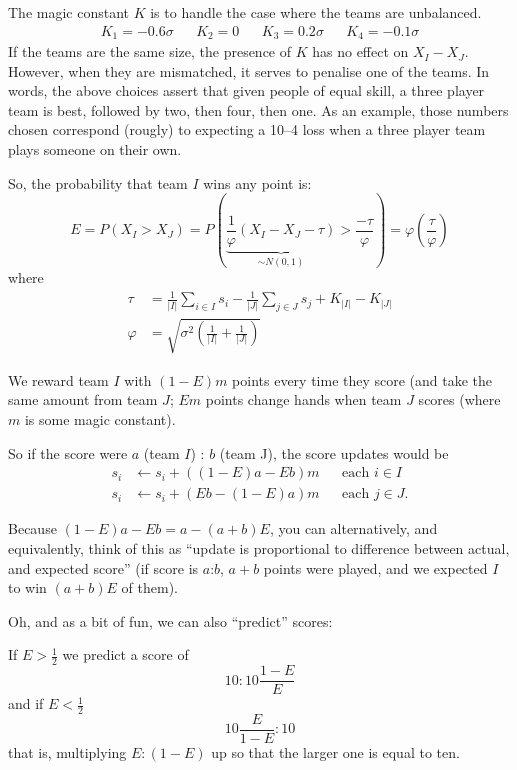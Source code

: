 \documentclass{article}
\begin{document}
The magic constant $K$ is to handle the case where the teams are unbalanced.
\begin{align*}
    K_1 = -0.6\sigma &&
    K_2 =  0 &&
    K_3 =  0.2\sigma &&
    K_4 = -0.1\sigma
\end{align*}
If the teams are the same size, the presence of $K$ has no effect on $X_I - X_J$. However, when they are mismatched, it serves to penalise one of the teams.
In words, the above choices assert that given people of equal skill, a three player team is best, followed by two, then four, then one. As an example, those numbers chosen correspond (rougly) to expecting a 10--4 loss when a three player team plays someone on their own.

So, the probability that team $I$ wins any point is:
\[
    E = P( X_I > X_J ) = P\left( \underbrace{ \frac{1}{\varphi} ( X_I - X_J - \tau ) }_{\sim N(0, 1)}
                                 > \frac{-\tau}{\varphi} \right)
                       = \varphi\left( \frac{\tau}{\varphi} \right)
\]
where
\begin{align*}
    \tau &= \frac{1}{|I|} \sum_{i \in I} s_i - \frac{1}{|J|} \sum_{j \in J} s_j + K_{|I|} - K_{|J|} \\
    \varphi &= \sqrt{ \sigma^2 \left( \frac{1}{|I|} + \frac{1}{|J|} \right) }
\end{align*}

We reward team $I$ with $(1 - E)m$ points every time they score (and take the same amount from team $J$; $Em$ points change hands when team $J$ scores (where $m$ is some magic constant).

So if the score were $a$ (team $I$) : $b$ (team J), the score updates would be
\begin{align*}
    s_i &\leftarrow s_i + ((1-E)a - Eb)m && \text{each } i \in I \\
    s_i &\leftarrow s_i + (Eb - (1-E)a)m && \text{each } j \in J
    \text{.}
\end{align*}

Because $(1-E)a - Eb = a - (a + b)E$, you can alternatively, and equivalently, think of this as ``update is proportional to difference between actual, and expected score'' (if score is $a$:$b$, $a + b$ points were played, and we expected $I$ to win $(a+b)E$ of them).

Oh, and as a bit of fun, we can also ``predict'' scores:

If $E > \frac{1}{2}$ we predict a score of
\[
    10 : 10 \frac{1 - E}{E}
\]
and if $E < \frac{1}{2}$
\[
    10 \frac{E}{1 - E} : 10
\]
that is, multiplying $E : (1 - E)$ up so that the larger one is equal to ten.
\end{document}
